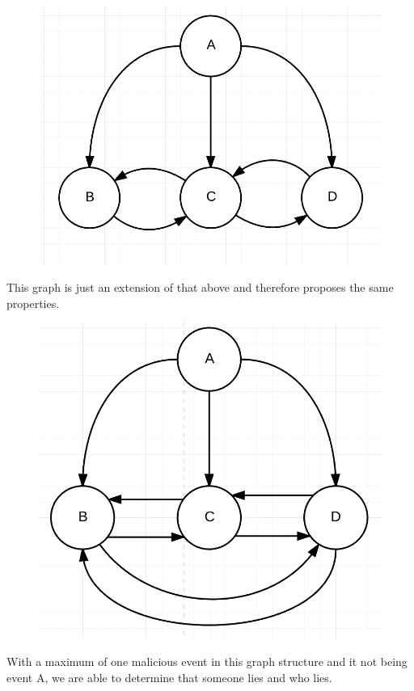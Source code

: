\begin{figure}
	\centering
	\includegraphics{figures/GraphStructure_OneToTwoChain}
\end{figure}
This graph is just an extension of that above and therefore proposes the same properties.

\begin{figure}
	\centering
	\includegraphics{figures/GraphStructure_OneToThree}
\end{figure}
With a maximum of one malicious event in this graph structure and it not being event A, we are able to determine that someone lies and who lies.


